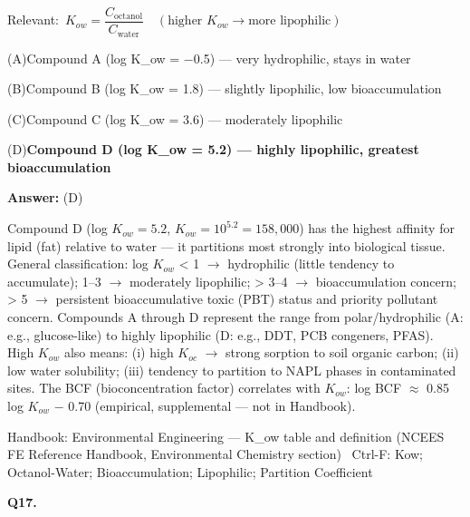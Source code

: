 \documentclass[11pt]{article}
\newcommand{\correct}[1]{\textbf{#1}\;{\color{accent}$\checkmark$}}
\newcommand{\optline}[2]{\par\noindent\hspace{1.2em}(#1)\hspace{0.6em}#2}
\begin{document}
{\small\color{soft}Relevant:}\ $K_{ow} = \dfrac{C_{\mathrm{octanol}}}{C_{\mathrm{water}}}\quad(\text{higher }K_{ow} \rightarrow \text{more lipophilic})$\par\vspace{3pt}
\optline{A}{Compound A (log K\_ow = $-$0.5) --- very hydrophilic, stays in water}
\optline{B}{Compound B (log K\_ow = 1.8) --- slightly lipophilic, low bioaccumulation}
\optline{C}{Compound C (log K\_ow = 3.6) --- moderately lipophilic}
\optline{D}{\correct{Compound D (log K\_ow = 5.2) --- highly lipophilic, greatest bioaccumulation}}
\par\vspace{3pt}
\vspace{2pt}\par\noindent\colorbox{boxbg}{\parbox{\dimexpr\linewidth-2\fboxsep\relax}{%
\vspace{2pt}\textbf{Answer:} (D)\par\vspace{2pt}
{\small Compound D (log $K_{ow} = 5.2$, $K_{ow} = 10^{5.2} = 158{,}000$) has the highest affinity for lipid (fat) relative to water --- it partitions most strongly into biological tissue. General classification: log $K_{ow}$ < 1 $\rightarrow$ hydrophilic (little tendency to accumulate); 1--3 $\rightarrow$ moderately lipophilic; > 3--4 $\rightarrow$ bioaccumulation concern; > 5 $\rightarrow$ persistent bioaccumulative toxic (PBT) status and priority pollutant concern. Compounds A through D represent the range from polar/hydrophilic (A: e.g., glucose-like) to highly lipophilic (D: e.g., DDT, PCB congeners, PFAS). High $K_{ow}$ also means: (i) high $K_{oc}$ $\rightarrow$ strong sorption to soil organic carbon; (ii) low water solubility; (iii) tendency to partition to NAPL phases in contaminated sites. The BCF (bioconcentration factor) correlates with $K_{ow}$: log BCF $\approx$ 0.85 log $K_{ow}$ $-$ 0.70 (empirical, supplemental --- not in Handbook).}\par\vspace{2pt}
{\footnotesize\color{soft}Handbook: Environmental Engineering --- K\_ow table and definition (NCEES FE Reference Handbook, Environmental Chemistry section) \textbullet\ Ctrl-F: Kow; Octanol-Water; Bioaccumulation; Lipophilic; Partition Coefficient}\vspace{2pt}
}}
\vspace{9pt}
\filbreak
\textbf{\color{accent}Q17.}\par\vspace{2pt}
\end{document}
